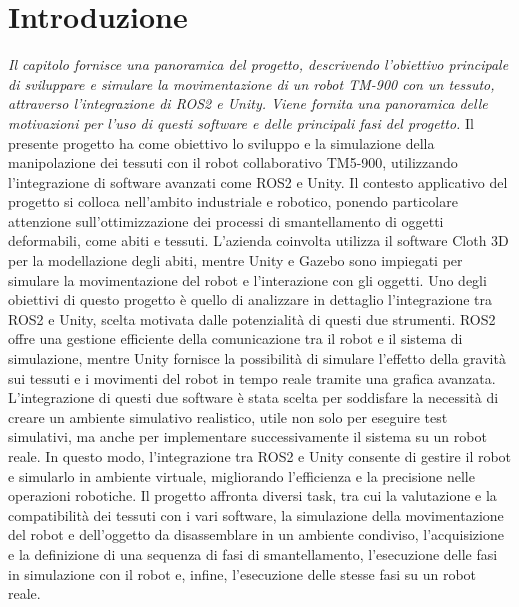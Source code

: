 \documentclass[11pt]{report}
\begin{document}
\tableofcontents
\newpage

\pagestyle{plain}

\newpage
\chapter{Introduzione}
\textit{Il capitolo fornisce una panoramica del progetto, descrivendo l'obiettivo principale di sviluppare e simulare la movimentazione di un robot TM-900 con un tessuto, attraverso l'integrazione di ROS2 e Unity. Viene fornita una panoramica delle motivazioni per l'uso di questi software e delle principali fasi del progetto.}
\vspace{0.5cm}
\newline
Il presente progetto ha come obiettivo lo sviluppo e la simulazione della manipolazione dei tessuti con il robot collaborativo TM5-900, utilizzando l'integrazione di software avanzati come ROS2 e Unity. Il contesto applicativo del progetto si colloca nell'ambito industriale e robotico, ponendo particolare attenzione sull'ottimizzazione dei processi di smantellamento di oggetti deformabili, come abiti e tessuti. L'azienda coinvolta utilizza il software Cloth 3D per la modellazione degli abiti, mentre Unity e Gazebo sono impiegati per simulare la movimentazione del robot e l'interazione con gli oggetti.
Uno degli obiettivi di questo progetto è quello di analizzare in dettaglio l'integrazione tra ROS2 e Unity, scelta motivata dalle potenzialità di questi due strumenti. ROS2 offre una gestione efficiente della comunicazione tra il robot e il sistema di simulazione, mentre Unity fornisce la possibilità di simulare l'effetto della gravità sui tessuti e i movimenti del robot in tempo reale tramite una grafica avanzata. L'integrazione di questi due software è stata scelta per soddisfare la necessità di creare un ambiente simulativo realistico, utile non solo per eseguire test simulativi, ma anche per implementare successivamente il sistema su un robot reale.
In questo modo, l'integrazione tra ROS2 e Unity consente di gestire il robot e simularlo in ambiente virtuale, migliorando l'efficienza e la precisione nelle operazioni robotiche. Il progetto affronta diversi task, tra cui la valutazione e la compatibilità dei tessuti con i vari software, la simulazione della movimentazione del robot e dell'oggetto da disassemblare in un ambiente condiviso, l'acquisizione e la definizione di una sequenza di fasi di smantellamento, l'esecuzione delle fasi in simulazione con il robot e, infine, l'esecuzione delle stesse fasi su un robot reale.
\end{document}
